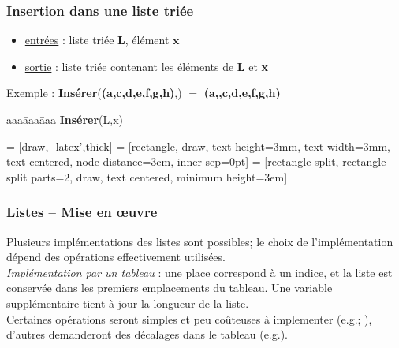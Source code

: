 \begin{frame}
  \frametitle{Insertion dans une liste triée}
    \begin{itemize}
    \item[] \underline{entrées} : liste triée \textbf{L}, élément $\mathbf{x}$
    \item[] \underline{sortie} :  liste triée contenant les éléments de \textbf{L} et \textbf{x}
    \end{itemize}
    Exemple : \textbf{Insérer}(\textbf{(a,c,d,e,f,g,h)},\textbf{}) $ = $ \textbf{(a,\textbf{},c,d,e,f,g,h)}
    
  \begin{tabbing}
    aaa\=aaa\=aaa\kill
    \textbf{Insérer}(L,x) \\
  \end{tabbing}

\end{frame}


  = [draw, -latex',thick]
 = [rectangle, draw, text height=3mm, text width=3mm, text centered, node distance=3cm, inner sep=0pt]
 = [rectangle split, rectangle split parts=2, draw,
  text centered, minimum height=3em]


\begin{frame} \frametitle{Listes -- Mise en {\oe}uvre}
Plusieurs implémentations des listes sont possibles; le choix de l’implémentation dépend des opérations effectivement utilisées. \\

\emph{Implémentation par un tableau} : une place correspond à un indice, et la liste est conservée dans les premiers emplacements du tableau. Une variable supplémentaire tient à jour la longueur de la liste. \\
Certaines opérations seront simples et peu coûteuses à implementer (e.g.; ), d'autres  demanderont des décalages dans le tableau (e.g.).
\end{frame}


